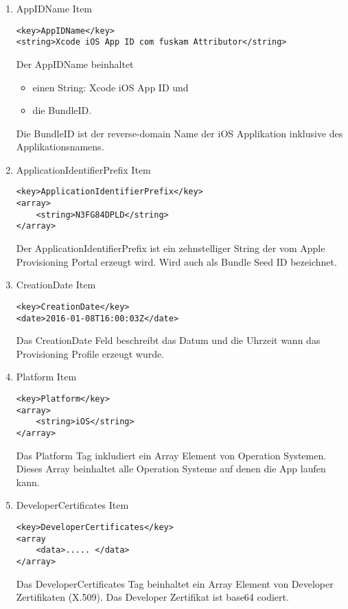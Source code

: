 \begin{enumerate}
    \item AppIDName Item
\begin{lstlisting}[caption={AppIDName Item}]
<key>AppIDName</key>
<string>Xcode iOS App ID com fuskam Attributor</string>
\end{lstlisting}
Der \glqq AppIDName\grqq{} beinhaltet
\begin{itemize}
    \item einen String: Xcode iOS App ID und
    \item die BundleID.
\end{itemize}
Die \glqq BundleID\grqq{} ist der \glqq reverse-domain Name\grqq{} der iOS Applikation inklusive des Applikationsnamens.

    \item ApplicationIdentifierPrefix Item
\begin{lstlisting}[caption={ApplicationIdentifierPrefix Item}]
<key>ApplicationIdentifierPrefix</key>
<array>
    <string>N3FG84DPLD</string>
</array>
\end{lstlisting}
Der \glqq ApplicationIdentifierPrefix\grqq{} ist ein zehnstelliger String der vom Apple Provisioning Portal erzeugt wird.  
Wird auch als Bundle Seed ID bezeichnet.

    \item CreationDate Item
\begin{lstlisting}[caption={CreationDate Item}]        
<key>CreationDate</key>
<date>2016-01-08T16:00:03Z</date>
\end{lstlisting}
Das \glqq CreationDate\grqq{} Feld beschreibt das Datum und die Uhrzeit wann das Provisioning Profile erzeugt wurde.

    \item Platform Item
\begin{lstlisting}[caption={Platform Item}]        
<key>Platform</key>
<array>
    <string>iOS</string>
</array>
\end{lstlisting}
Das \glqq Platform\grqq{} Tag inkludiert ein Array Element von Operation Systemen. Dieses Array beinhaltet alle Operation Systeme auf denen die App laufen kann.

    \item DeveloperCertificates Item
\begin{lstlisting}[caption={DeveloperCertificates Item}]        
<key>DeveloperCertificates</key>
<array                
    <data>..... </data>
</array>
\end{lstlisting}
Das \glqq DeveloperCertificates\grqq{} Tag beinhaltet ein Array Element von Developer Zertifikaten (X.509). Das Developer Zertifikat ist base64 codiert. 


\end{enumerate}
